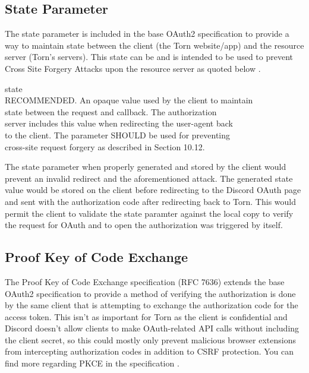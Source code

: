 \documentclass{article}
\begin{document}
{\subsection{State Parameter}
\par{The state parameter is included in the base OAuth2 specification to provide a way to maintain state between the client (the Torn website/app) and the resource server (Torn's servers). This state can be and is intended to be used to prevent Cross Site Forgery Attacks upon the resource server as quoted below \cite{oauth-authorization-request}.}
\begin{displayquote}
	state \\
        RECOMMENDED.  An opaque value used by the client to maintain \\
        state between the request and callback.  The authorization \\
        server includes this value when redirecting the user-agent back \\
        to the client.  The parameter SHOULD be used for preventing \\
        cross-site request forgery as described in Section 10.12. \\
\end{displayquote}

\par{The state parameter when properly generated and stored by the client would prevent an invalid redirect and the aforementioned attack. The generated state value would be stored on the client before redirecting to the Discord OAuth page and sent with the authorization code after redirecting back to Torn. This would permit the client to validate the state paramter against the local copy to verify the request for OAuth and to open the authorization was triggered by itself.}

\subsection{Proof Key of Code Exchange}
\par{The Proof Key of Code Exchange specification (RFC 7636) extends the base OAuth2 specification to provide a method of verifying the authorization is done by the same client that is attempting to exchange the authorization code for the access token. This isn't as important for Torn as the client is confidential and Discord doesn't allow clients to make OAuth-related API calls without including the client secret, so this could mostly only prevent malicious browser extensions from intercepting authorization codes in addition to CSRF protection. You can find more regarding PKCE in the specification \cite{oauth-pkce}.}

}
\end{document}
